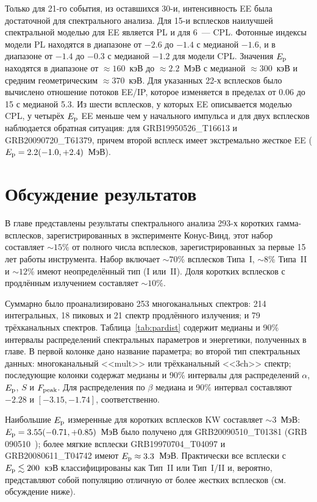 Только для 21-го события, из оставшихся 30-и, интенсивность EE была достаточной для спектрального анализа.
Для 15-и всплесков наилучшей спектральной моделью для EE является PL и для 6~--- CPL.   
Фотонные индексы модели PL находятся в диапазоне от $-2.6$ до $-1.4$ с медианой $-1.6$,
и в диапазоне от $-1.4$ до $-0.3$ с медианой $-1.2$ для модели CPL.
Значения $E_{\mathrm{p}}$ находятся в диапазоне от $\approx160$~кэВ до $\approx 2.2$~МэВ с медианой $\approx300$~кэВ
и средним геометрическим $\approx370$~кэВ. 
Для указанных 22-х всплесков было вычислено отношение потоков EE/IP, 
которое изменяется в пределах от 0.06 до 15 с медианой 5.3. 
Из шести всплесков, у которых EE описывается моделью CPL, у четырёх $E_{\mathrm{p}}$ EE 
меньше чем у начального импульса и для двух всплесков наблюдается обратная ситуация:
для GRB19950526\_T16613 и GRB20090720\_T61379, причем второй всплеск имеет экстремально
жесткое EE ($E_{\mathrm{p}} = 2.2(-1.0,+2.4)$~МэВ).


\section{Обсуждение результатов}\label{sec:SUMMARY}
В главе представлены результаты спектрального анализа 293-х коротких гамма-всплесков,
зарегистрированных в эксперименте Конус-Винд, этот набор составляет $\sim 15$\% 
от полного числа всплесков, зарегистрированных за первые 15 лет работы инструмента.
Набор включает $\sim 70$\% всплесков Типа~I, $\sim 8$\% Типа~II и $\sim 12$\%
имеют неопределённый тип (I или~II). Доля коротких всплесков с продлённым 
излучением составляет $\sim 10$\%.

Суммарно было проанализировано 253 многоканальных спектров: 214 интегральных,
18 пиковых и 21 спектр продлённого излучения; и 79 трёхканальных спектров.
Таблица~\ref{tab:pardist} содержит медианы и 90\% интервалы распределений спектральных
параметров и энергетики, полученных в главе. В первой колонке дано название параметра;
во второй тип спектральных данных: многоканальный <<mult>> или трёхканальный <<3ch>> спектр;
последующие колонки содержат медианы и 90\% интервалы для распределений
$\alpha$, $E_{\mathrm{p}}$, $S$ и $F_{\mathrm{peak}}$. Для распределения по $\beta$
медиана и 90\% интервал составляют $-2.28$ и $[-3.15,-1.74]$, соответственно.

Наибольшие $E_{\mathrm{p}}$ измеренные для коротких всплесков KW составляет $\sim 3$~МэВ: 
$E_{\mathrm{p}} = 3.55(-0.71,+0.85)$~МэВ было получено для GRB20090510\_T01381
(GRB 090510~\citep{Ackermann_2010ApJ_716_1178A});
более мягкие всплески GRB19970704\_T04097 и GRB20080611\_T04742 имеют $E_{\mathrm{p}} \approx 3.3$~МэВ.
Практически все всплески с $E_{\mathrm{p}} \lesssim 200$~кэВ классифицированы как Тип~II или Тип~I/II
и, вероятно, представляют собой популяцию отличную от более жестких всплесков (см. обсуждение ниже).

